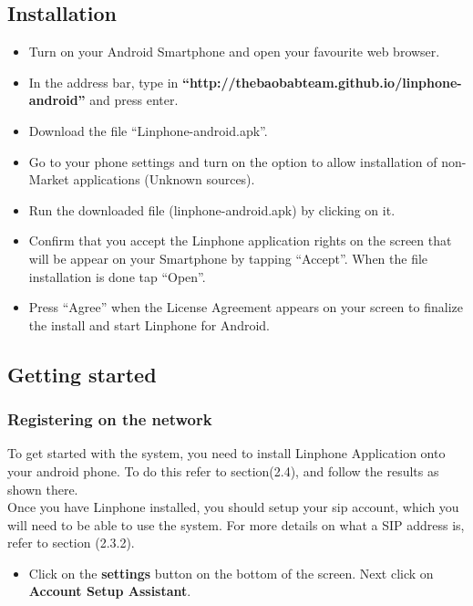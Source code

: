 \documentclass[a4paper]{article}
\begin{document}
\subsection{Installation}
\begin{itemize}
\item Turn on your Android Smartphone and open your favourite web browser.
\item In the address bar, type in \textbf{“http://thebaobabteam.github.io/linphone-android”} and press enter.
\item Download the file “Linphone-android.apk”.
\item Go to your phone settings and turn on the option to allow installation of non-Market applications (Unknown sources).
\item Run the downloaded file (linphone-android.apk) by clicking on it.
\item Confirm that you accept the Linphone application rights on the screen that will be appear on your Smartphone by tapping “Accept”. When the file installation is done tap “Open”.
\item Press “Agree” when the License Agreement appears on your screen to finalize the install and start Linphone for Android.
\end{itemize}

\subsection{Getting started}

\subsubsection{Registering on the network}
To get started with the system, you need to install Linphone Application onto your android phone. To do this refer to section(2.4), and follow the results as shown there.\\

Once you have Linphone installed, you should setup your sip account, which you will need to be able to use the system. For more details on what a SIP address is, refer to section (2.3.2).\\


\begin{itemize}
\item Click on the \textbf{settings} button on the bottom of the screen. Next click on  \textbf{Account Setup Assistant}.
\end{itemize}
\end{document}
